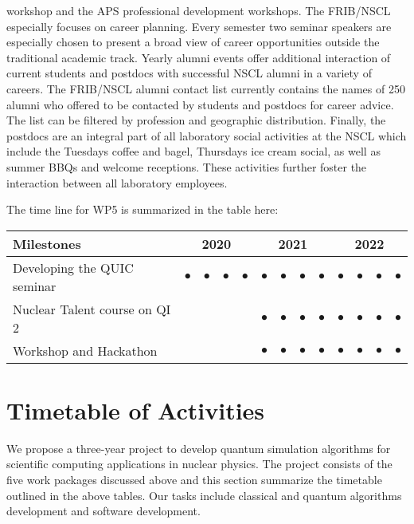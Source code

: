 \documentclass[10pt]{article}
\begin{document}
workshop and the APS professional development workshops. The FRIB/NSCL
especially focuses on career planning. Every semester two seminar
speakers are especially chosen to present a broad view of career
opportunities outside the traditional academic track. Yearly alumni
events offer additional interaction of current students and postdocs
with successful NSCL alumni in a variety of careers.  The FRIB/NSCL
alumni contact list currently contains the names of 250 alumni who
offered to be contacted by students and postdocs for career advice.  The list can be
filtered by profession and geographic distribution.  Finally, the
postdocs are an integral part of all laboratory social activities at
the NSCL which include the Tuesdays coffee and bagel, Thursdays ice
cream social, as well as summer BBQs and welcome receptions. These
activities further foster the interaction between all laboratory
employees.



The time line for WP5 is summarized in the table here:
\begin{footnotesize}
\begin{center}
\begin{tabular}{|l|c|c|c|c|c|c|c|c|c|c|c|c|}
\hline
\multicolumn{1}{|l}{Milestones } & \multicolumn{4}{|c|}{ 2020 } & \multicolumn{4}{c|}{ 2021 } & \multicolumn{4}{c|}{ 2022 } \\
\hline
Developing the QUIC seminar &$\bullet$ &$\bullet$ &$\bullet$ &$\bullet$ &$\bullet$ &$\bullet$ &$\bullet$ &$\bullet$ &$\bullet$ &$\bullet$ &$\bullet$ &$\bullet$  \\
\hline
Nuclear Talent course on QI 2 & & & & &$\bullet$ &$\bullet$ &$\bullet$ &$\bullet$ &$\bullet$ &$\bullet$ &$\bullet$ &$\bullet$  \\
\hline
Workshop and Hackathon & & & & &$\bullet$ &$\bullet$ &$\bullet$ &$\bullet$ &$\bullet$ &$\bullet$ &$\bullet$ &$\bullet$  \\
\hline


\end{tabular}
\end{center}
\end{footnotesize}


\section{Timetable of Activities}
We propose a three-year project to develop quantum simulation algorithms for scientific computing applications in nuclear physics. The project consists of the five work packages discussed above and this section summarize the timetable outlined in the above tables. Our tasks include classical and quantum algorithms
development and software development.
\end{document}
